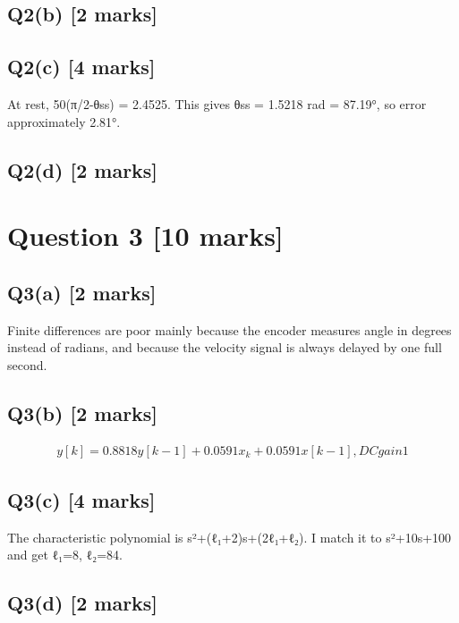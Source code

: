 \documentclass[11pt,a4paper]{article}
\begin{document}
\subsection*{Q2(b) \hfill [2 marks]}

\vspace{2mm}

\subsection*{Q2(c) \hfill [4 marks]}

At rest, 50(π/2-θss) = 2.4525.
This gives θss = 1.5218 rad = 87.19°, so error approximately 2.81°.

\subsection*{Q2(d) \hfill [2 marks]}

\vspace{2mm}

\section*{Question 3 \hfill [10 marks]}
\subsection*{Q3(a) \hfill [2 marks]}

Finite differences are poor mainly because the encoder measures angle in degrees instead of radians, and because the velocity signal is always delayed by one full second.

\subsection*{Q3(b) \hfill [2 marks]}

\[\begin{aligned}y[k]=0.8818y[k-1]+0.0591x_k+0.0591x[k-1], DC gain 1\end{aligned}\]

\subsection*{Q3(c) \hfill [4 marks]}

The characteristic polynomial is s²+(ℓ₁+2)s+(2ℓ₁+ℓ₂).
I match it to s²+10s+100 and get ℓ₁=8, ℓ₂=84.

\subsection*{Q3(d) \hfill [2 marks]}
\end{document}
